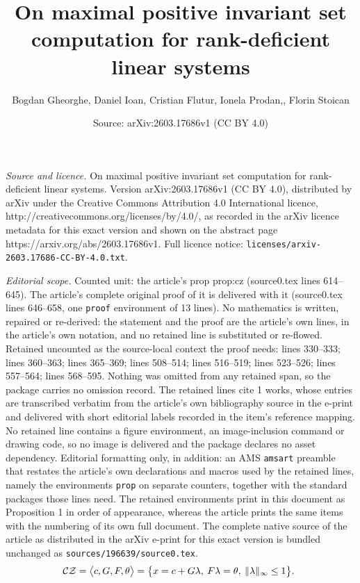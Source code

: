 \documentclass[10pt,a4paper]{amsart}
\title{On maximal positive invariant set computation for rank-deficient linear systems}
\author{Bogdan Gheorghe, Daniel Ioan, Cristian Flutur, Ionela Prodan,, Florin Stoican}
\date{Source: arXiv:2603.17686v1 (CC BY 4.0)}
\begin{document}
\maketitle

\noindent\emph{Source and licence.} On maximal positive invariant set computation for rank-deficient linear systems. Version arXiv:2603.17686v1 (CC BY 4.0), distributed by arXiv under the Creative Commons Attribution 4.0 International licence, http://creativecommons.org/licenses/by/4.0/, as recorded in the arXiv licence metadata for this exact version and shown on the abstract page https://arxiv.org/abs/2603.17686v1. Full licence notice: \texttt{licenses/arxiv-2603.17686-CC-BY-4.0.txt}.\par\smallskip

\noindent\textit{Editorial scope.} Counted unit: the article's prop prop:cz (source0.tex lines 614--645). The article's complete original proof of it is delivered with it (source0.tex lines 646--658, one \texttt{proof} environment of 13 lines). No mathematics is written, repaired or re-derived: the statement and the proof are the article's own lines, in the article's own notation, and no retained line is substituted or re-flowed.  Retained uncounted as the source-local context the proof needs: lines 330--333; lines 360--363; lines 365--369; lines 508--514; lines 516--519; lines 523--526; lines 557--564; lines 568--595.  Nothing was omitted from any retained span, so the package carries no omission record.  The retained lines cite 1 works, whose entries are transcribed verbatim from the article's own bibliography source in the e-print and delivered with short editorial labels recorded in the item's reference mapping.  No retained line contains a figure environment, an image-inclusion command or drawing code, so no image is delivered and the package declares no asset dependency.  Editorial formatting only, in addition: an AMS \texttt{amsart} preamble that restates the article's own declarations and macros used by the retained lines, namely the environments \texttt{prop} on separate counters, together with the standard packages those lines need.  The retained environments print in this document as Proposition 1 in order of appearance, whereas the article prints the same items with the numbering of its own full document.  The complete native source of the article as distributed in the arXiv e-print for this exact version is bundled unchanged as \texttt{sources/196639/source0.tex}.
\begin{equation}
\label{eq:con_poly_zono}
    \mkern-8mu\mathcal{CZ} = \bigl\langle c, G, F, \theta\bigr\rangle = \big \{x = c + G\lambda,\: F\lambda=\theta,\: \|\lambda\|_\infty \leq 1\bigr\}.
\end{equation}
\end{document}
